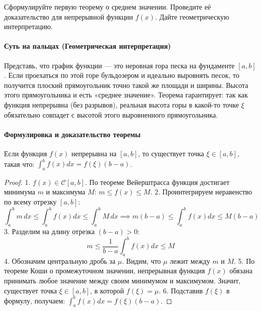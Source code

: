 {Сформулируйте первую теорему о среднем значении. Проведите её доказательство для непрерывной функции $f(x)$. Дайте геометрическую интерпретацию.}

\paragraph{Суть на пальцах (Геометрическая интерпретация)}
Представь, что график функции — это неровная гора песка на фундаменте $[a,b]$. Если проехаться по этой горе бульдозером и идеально выровнять песок, то получится плоский прямоугольник точно такой же площади и ширины. 
Высота этого прямоугольника и есть «среднее значение». Теорема гарантирует: так как функция непрерывна (без разрывов), реальная высота горы в какой-то точке $\xi$ обязательно совпадет с высотой этого выровненного прямоугольника.

\vspace{0.5em}
\begin{center}
\end{center}
\vspace{0.5em}

\paragraph{Формулировка и доказательство теоремы}
Если функция $f(x)$ непрерывна на $[a, b]$, то существует точка $\xi \in [a, b]$, такая что: $\int_a^b f(x) dx = f(\xi)(b - a)$.
\begin{proof}
1. $f(x) \in \mathcal{C}[a, b]$. По теореме Вейерштрасса функция достигает минимума $m$ и максимума $M$: $m \le f(x) \le M$.
2. Проинтегрируем неравенство по всему отрезку $[a, b]$:
$$ \int_a^b m \, dx \le \int_a^b f(x) dx \le \int_a^b M \, dx \implies m(b-a) \le \int_a^b f(x) dx \le M(b-a) $$
3. Разделим на длину отрезка $(b - a) > 0$:
$$ m \le \frac{1}{b - a} \int_a^b f(x) dx \le M $$
4. Обозначим центральную дробь за $\mu$. Видим, что $\mu$ лежит между $m$ и $M$.
5. По теореме Коши о промежуточном значении, непрерывная функция $f(x)$ обязана принимать любое значение между своим минимумом и максимумом. Значит, существует точка $\xi \in [a, b]$, в которой $f(\xi) = \mu$.
6. Подставив $f(\xi)$ в формулу, получаем: $\int_a^b f(x) dx = f(\xi)(b - a)$.
\end{proof}

